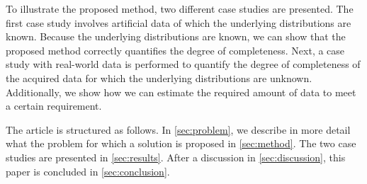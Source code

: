 To illustrate the proposed method, two different case studies are presented. The first case study involves artificial data of which the underlying distributions are known. Because the underlying distributions are known, we can show that the proposed method correctly quantifies the degree of completeness. Next, a case study with real-world data is performed to quantify the degree of completeness of the acquired data for which the underlying distributions are unknown. Additionally, we show how we can estimate the required amount of data to meet a certain requirement.

The article is structured as follows. %
In \cref{sec:problem}, we describe in more detail what the problem for which a solution is proposed in \cref{sec:method}. The two case studies are presented in \cref{sec:results}. After a discussion in \cref{sec:discussion}, this paper is concluded in \cref{sec:conclusion}.
